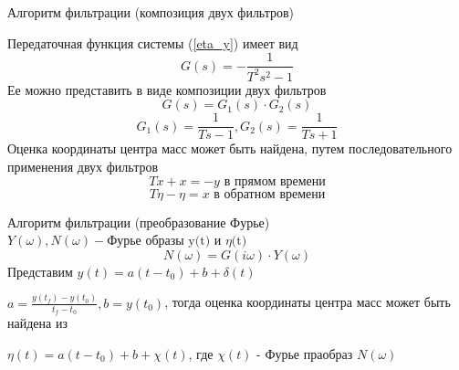 \documentclass[10pt]{beamer}
\begin{document}
\begin{frame}{Алгоритм фильтрации (композиция двух фильтров)}

Передаточная функция системы (\ref*{eta_y}) имеет вид 
\[
	G(s)=-\frac{1}{T^2s^2-1}
\]
Ее можно представить в виде композиции двух фильтров
\[
	G(s)=G_1(s)\cdot G_2(s) 
\]
\[
	G_1(s)=\frac{1}{Ts-1}, G_2(s)=\frac{1}{Ts+1}
\]
Оценка координаты центра масс может быть найдена, путем последовательного применения двух фильтров
\[
	T \dot{x}+x=-y \text{ в прямом времени}
\]
\[
	T \dot{\eta}-\eta=x \text{ в обратном времени}
\]

\end{frame}

\begin{frame}{Алгоритм фильтрации (преобразование Фурье)}
	$Y(\omega),N(\omega) - \text{Фурье образы y(t) и $\eta$(t)}$
	\[
		N(\omega)=G(i\omega)\cdot Y(\omega)
	\]
	Представим $y(t)=a(t-t_0)+b+\delta(t)$ 

	$a=\frac{y(t_f)-y(t_0)}{t_f-t_0}, b=y(t_0)$, тогда оценка координаты центра масс может быть найдена из

	$\eta(t)=a(t-t_0)+b+\chi(t)$, где $\chi(t)$ - Фурье праобраз $N(\omega)$
	
\end{frame}
\end{document}
